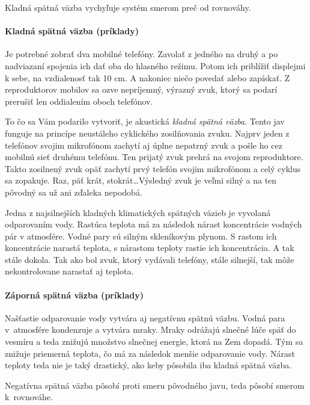 \documentclass[a4paper, 10pt, ]{article}
\begin{document}
Kladná spätná väzba vychyľuje systém smerom preč od rovnováhy.


\paragraph{Kladná spätná väzba (príklady)}

Je potrebné zobrať dva mobilné telefóny. Zavolať z jedného na druhý a po nadviazaní spojenia ich dať oba do hlasného režimu. Potom ich priblížiť displejmi k sebe, na vzdialenosť tak 10 cm. A nakoniec niečo povedať alebo zapískať. Z reproduktorov mobilov sa ozve nepríjemný, výrazný zvuk, ktorý sa podarí prerušiť len oddialením oboch telefónov.

To čo sa Vám podarilo vytvoriť, je akustická \emph{kladná spätná väzba}. Tento jav funguje na princípe neustáleho cyklického zosilňovania zvuku. Najprv jeden z telefónov svojim mikrofónom zachytí aj úplne nepatrný zvuk a pošle ho cez mobilnú sieť druhému telefónu. Ten prijatý zvuk prehrá na svojom reproduktore. Takto zosilnený zvuk opäť zachytí prvý telefón svojim mikrofónom a celý cyklus sa zopakuje. Raz, päť krát, stokrát\ldots Výsledný zvuk je veľmi silný a na ten pôvodný sa už ani zďaleka nepodobá.

\bigskip

\noindent
Jedna z najsilnejších kladných klimatických spätných väzieb je vyvolaná odparovaním vody. Rastúca teplota má za následok nárast koncentrácie vodných pár v atmosfére. Vodné pary sú silným skleníkovým plynom. S rastom ich koncentrácie narastá teplota, s nárastom teploty rastie ich koncentrácia. A tak stále dokola. Tak ako bol zvuk, ktorý vydávali telefóny, stále silnejší, tak môže nekontrolovane narastať aj teplota.

\paragraph{Záporná spätná väzba (príklady)}

Našťastie odparovanie vody vytvára aj negatívnu spätnú väzbu. Vodná para v~atmosfére kondenzuje a vytvára mraky. Mraky odrážajú slnečné lúče späť do vesmíru a teda znižujú množstvo slnečnej energie, ktorá na Zem dopadá. Tým sa znižuje priemerná teplota, čo má za následok menšie odparovanie vody. Nárast teploty teda nie je taký drastický, ako keby pôsobila iba kladná spätná väzba.


\bigskip

\noindent
Negatívna spätná väzba pôsobí proti smeru pôvodného javu, teda pôsobí smerom k~rovnováhe.
\end{document}

